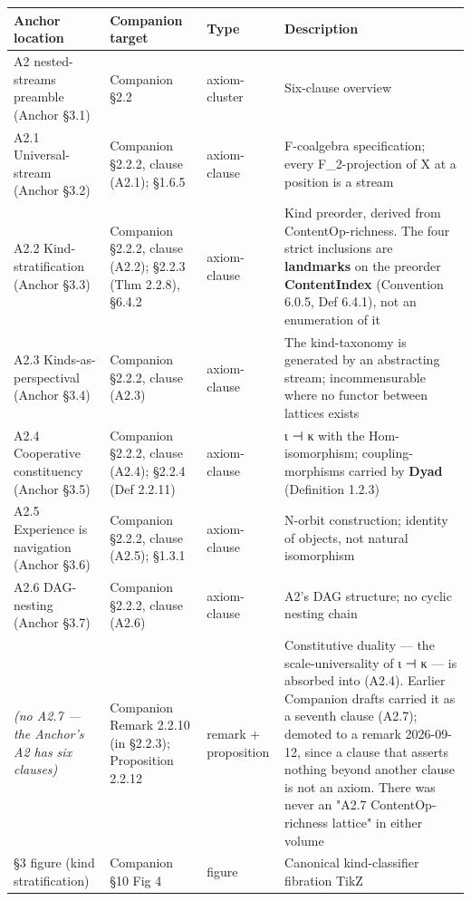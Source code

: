\documentclass[11pt, openany]{book}
\begin{document}
\begingroup\setlength{\tabcolsep}{3pt}\renewcommand{\arraystretch}{1.15}\footnotesize
\begin{longtable}{p{0.52in} p{0.52in} p{0.52in} p{2.70in}}
\toprule
Anchor location & Companion target & Type & Description \\
\midrule
\endhead
\bottomrule
\endfoot
A2 nested-streams preamble (Anchor §3.1) & Companion §2.2 & axiom-cluster & Six-clause overview \\
\midrule
A2.1 Universal-stream (Anchor §3.2) & Companion §2.2.2, clause (A2.1); §1.6.5 & axiom-clause & F-coalgebra specification; every F\_\allowbreak{}2-projection of X at a position is a stream \\
\midrule
A2.2 Kind-stratification (Anchor §3.3) & Companion §2.2.2, clause (A2.2); §2.2.3 (Thm 2.2.8), §6.4.2 & axiom-clause & Kind preorder, derived from ContentOp-richness. The four strict inclusions are \textbf{landmarks} on the preorder \textbf{ContentIndex} (Convention 6.0.5, Def 6.4.1), not an enumeration of it \\
\midrule
A2.3 Kinds-as-perspectival (Anchor §3.4) & Companion §2.2.2, clause (A2.3) & axiom-clause & The kind-taxonomy is generated by an abstracting stream; incommensurable where no functor between lattices exists \\
\midrule
A2.4 Cooperative constituency (Anchor §3.5) & Companion §2.2.2, clause (A2.4); §2.2.4 (Def 2.2.11) & axiom-clause & ι ⊣ κ with the Hom-isomorphism; coupling-morphisms carried by \textbf{Dyad} (Definition 1.2.3) \\
\midrule
A2.5 Experience is navigation (Anchor §3.6) & Companion §2.2.2, clause (A2.5); §1.3.1 & axiom-clause & N-orbit construction; identity of objects, not natural isomorphism \\
\midrule
A2.6 DAG-nesting (Anchor §3.7) & Companion §2.2.2, clause (A2.6) & axiom-clause & A2's DAG structure; no cyclic nesting chain \\
\midrule
\textit{(no A2.7 --- the Anchor's A2 has six clauses)} & Companion Remark 2.2.10 (in §2.2.3); Proposition 2.2.12 & remark + proposition & Constitutive duality --- the scale-universality of ι ⊣ κ --- is absorbed into (A2.4). Earlier Companion drafts carried it as a seventh clause (A2.7); demoted to a remark 2026-09-12, since a clause that asserts nothing beyond another clause is not an axiom. There was never an "A2.7 ContentOp-richness lattice" in either volume \\
\midrule
§3 figure (kind stratification) & Companion §10 Fig 4 & figure & Canonical kind-classifier fibration TikZ \\
\bottomrule
\end{longtable}
\endgroup
\end{document}
